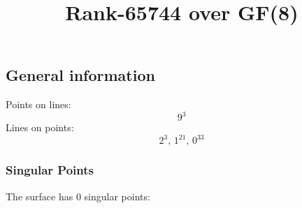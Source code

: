 \documentclass{article}
\newcommand\setTBstruts{\def\T{\rule{0pt}{2.6ex}}%
\def\B{\rule[-1.2ex]{0pt}{0pt}}}
\begin{document}
 
\setTBstruts



{\allowdisplaybreaks%






\title{Rank-65744 over GF(8)}
\author{}%
\maketitle%
%
{}



\subsection*{General information}
Points on lines:
$$
9^3$$
Lines on points:
$$
2^3,\,1^{21},\,0^{33}$$
\subsubsection*{Singular Points}
The surface has 0 singular points:\\
\begin{align*}
\end{align*}
}
\end{document}
